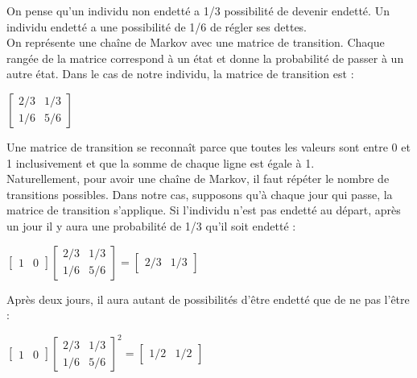 \documentclass[12pt, a4paper]{article}
\begin{document}
            On pense qu’un individu non endetté a 1/3 possibilité de devenir endetté. Un individu endetté a une possibilité de 1/6 de régler ses dettes.\\
On représente une chaîne de Markov avec une matrice de transition.
Chaque rangée de la matrice correspond à un état et donne la probabilité de passer à un autre état. Dans le cas de notre individu, la matrice de transition est :
            
            \begin{center}
                $
                \begin{bmatrix}
                    2/3 & 1/3\\
                    1/6 & 5/6
                \end{bmatrix}
                $
            \end{center}
            
            Une matrice de transition se reconnaît parce que toutes les valeurs sont entre 0 et 1 inclusivement et que la somme de chaque ligne est égale à 1.\\
Naturellement, pour avoir une chaîne de Markov, il faut répéter le nombre de transitions possibles. Dans notre cas, supposons qu’à chaque jour qui passe, la matrice de transition s’applique. Si l’individu n’est pas endetté au départ, après un jour il y aura une probabilité de 1/3 qu’il soit endetté :\\
            
            \begin{center}
                $
                \begin{bmatrix}
                    1 & 0
                \end{bmatrix}
                \begin{bmatrix}
                    2/3 & 1/3\\
                    1/6 & 5/6
                \end{bmatrix}
                =
                \begin{bmatrix}
                    2/3 & 1/3
                \end{bmatrix}
                $
            \end{center}
            
            Après deux jours, il aura autant de possibilités d’être endetté que de ne pas l’être :\\
            
            \begin{center}
                $
                \begin{bmatrix}
                    1 & 0
                \end{bmatrix}
                \begin{bmatrix}
                    2/3 & 1/3\\
                    1/6 & 5/6
                \end{bmatrix}^2
                =
                \begin{bmatrix}
                    1/2 & 1/2
                \end{bmatrix}
                $
            \end{center}
            
\end{document}
